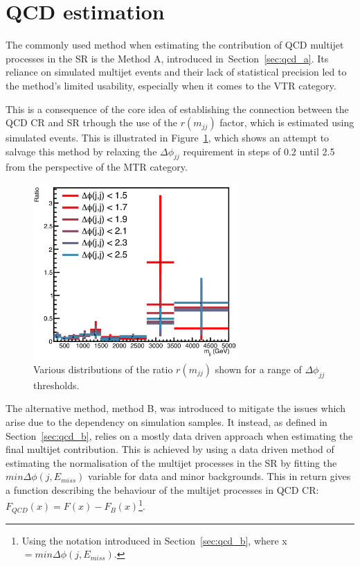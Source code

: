 \section{QCD estimation}
\hspace{10pt} The commonly used method when estimating the contribution of QCD multijet processes in the SR is the Method A, introduced in~Section~\ref{sec:qcd_a}. Its reliance on simulated multijet events and their lack of statistical precision led to the method's limited usability, especially when it comes to the VTR category.

\hspace{10pt} This is a consequence of the core idea of establishing the connection between the QCD CR and SR trhough the use of the $r(m_{jj})$ factor, which is estimated using simulated events. This is illustrated in Figure~\ref{fig:qCD_A_ratio}, which shows an attempt to salvage this method by relaxing the $\Delta \phi_{jj}$ requirement in steps of 0.2 until 2.5 from the perspective of the MTR category.

\begin{figure}[htbp]
  \centering
    \includegraphics[width= 0.7\textwidth]{FIt_structure/qcd_a_relaxed.png}
  \caption{Various distributions of the ratio $r(m_{jj})$ shown for a range of $\Delta\phi_{jj}$ thresholds.}
  \label{fig:qCD_A_ratio}
\end{figure}


\hspace{10pt} The alternative method, method B, was introduced to mitigate the issues which arise due to the dependency on simulation samples. It instead, as defined in Section~\ref{sec:qcd_b}, relies on a mostly data driven approach when estimating the final multijet contribution. This is achieved by using a data driven method of estimating the normalisation of the multijet processes in the SR by fitting the $min\Delta\phi(j, E_{miss})$ variable for data and minor backgrounds. This in return gives a function describing the behaviour of the multijet processes in QCD CR: $F_{QCD}(x) = F(x) - F_{B}(x)$\footnote{Using the notation introduced in Section~\ref{sec:qcd_b}, where x~$= min\Delta\phi(j, E_{miss})$.}.

